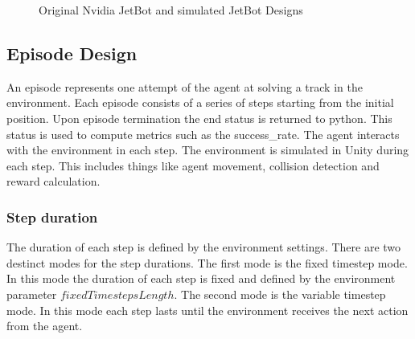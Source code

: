 \begin{figure}
    \centering
    \qquad
    \qquad
    \qquad
    \caption{Original Nvidia JetBot and simulated JetBot Designs}
    \label{fig:jetbots}
\end{figure}


\subsection{Episode Design}

An episode represents one attempt of the agent at solving a track in the environment. Each episode consists of a series of steps starting from the initial position. Upon episode termination the end status is returned to python. This status is used to compute metrics such as the success\_rate. The agent interacts with the environment in each step. The environment is simulated in Unity during each step. This includes things like agent movement, collision detection and reward calculation.

\subsubsection{Step duration}
The duration of each step is defined by the environment settings. There are two destinct modes for the step durations. The first mode is the fixed timestep mode. In this mode the duration of each step is fixed and defined by the environment parameter $fixedTimestepsLength$. The second mode is the variable timestep mode. In this mode each step lasts until the environment receives the next action from the agent.

